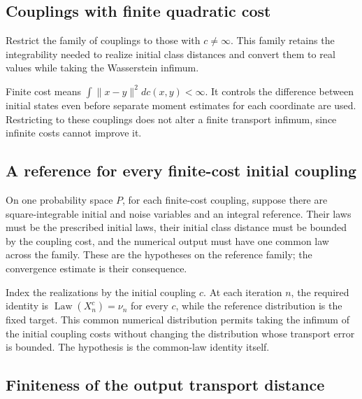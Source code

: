 \documentclass[11pt,a4paper]{report}
\begin{document}
\subsection{\texorpdfstring{Couplings with finite quadratic cost}{Couplings with finite quadratic cost}}
\label{report-step-UnadjustedLangevin-ReferenceFamily-lean-1}


Restrict the family of couplings to those with \(c\ne\infty\). This family retains the integrability needed to realize initial class distances and convert them to real values while taking the Wasserstein infimum.



Finite cost means \(\int\|x-y\|^2dc(x,y)<\infty\). It controls the difference between initial states even before separate moment estimates for each coordinate are used. Restricting to these couplings does not alter a finite transport infimum, since infinite costs cannot improve it.

\subsection{\texorpdfstring{A reference for every finite-cost initial coupling}{A reference for every finite-cost initial coupling}}
\label{report-step-UnadjustedLangevin-ReferenceFamily-lean-2}


On one probability space \(P\), for each finite-cost coupling, suppose there are square-integrable initial and noise variables and an integral reference. Their laws must be the prescribed initial laws, their initial class distance must be bounded by the coupling cost, and the numerical output must have one common law across the family. These are the hypotheses on the reference family; the convergence estimate is their consequence.



Index the realizations by the initial coupling \(c\). At each iteration \(n\), the required identity is \(\operatorname{Law}(X_n^c)=\nu_n\) for every \(c\), while the reference distribution is the fixed target. This common numerical distribution permits taking the infimum of the initial coupling costs without changing the distribution whose transport error is bounded. The hypothesis is the common-law identity itself.

\subsection{\texorpdfstring{Finiteness of the output transport distance}{Finiteness of the output transport distance}}
\label{report-step-UnadjustedLangevin-ReferenceFamily-lean-3}
\end{document}
